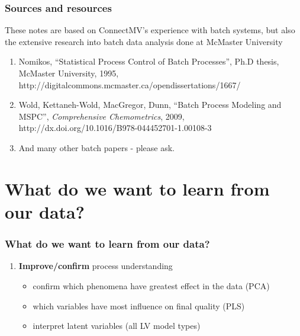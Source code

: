 
\begin{frame}\frametitle{Sources and resources}

These notes are based on ConnectMV's experience with batch systems, but also the extensive research into batch data analysis done at McMaster University

\begin{enumerate}

	\item	Nomikos, ``Statistical Process Control of Batch Processes'', Ph.D thesis, McMaster University, 1995, {\scriptsize http://digitalcommons.mcmaster.ca/opendissertations/1667/}
	
	
	\item	Wold, Kettaneh-Wold, MacGregor, Dunn, ``Batch Process Modeling and MSPC'', \emph{Comprehensive Chemometrics}, 2009, {\scriptsize http://dx.doi.org/10.1016/B978-044452701-1.00108-3}
		
	\item	And many other batch papers - please ask.
\end{enumerate}
\end{frame}

\begin{frame}\frametitle{}
\end{frame}

\section{What do we want to learn from our data?}

\begin{frame}\frametitle{What do we want to learn from our data?}

\begin{enumerate}
	\item {\bf \color{myGreen}Improve/confirm} process understanding
\begin{itemize}

	\item	confirm which phenomena have greatest effect in the data (PCA)

	\item	which variables have most influence on final quality (PLS)

	\item	interpret latent variables (all LV model types)

\end{itemize}
\end{enumerate}
\end{frame}

